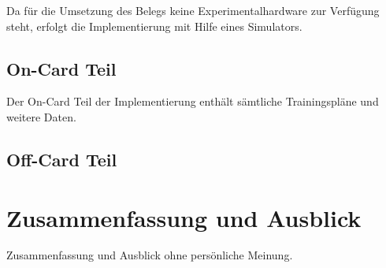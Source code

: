 \documentclass[a4paper,12pt]{scrartcl}
\begin{document}


Da für die Umsetzung des Belegs keine Experimentalhardware zur Verfügung steht, erfolgt die Implementierung mit Hilfe eines Simulators.

\subsection{On-Card Teil}
\label{subsec:3.2}
Der On-Card Teil der Implementierung enthält sämtliche Trainingspläne und weitere Daten.



\subsection{Off-Card Teil}
\label{subsec:3.3}


\clearpage
\section{Zusammenfassung und Ausblick}
\label{sec:5}
Zusammenfassung und Ausblick ohne persönliche Meinung.
\end{document}
